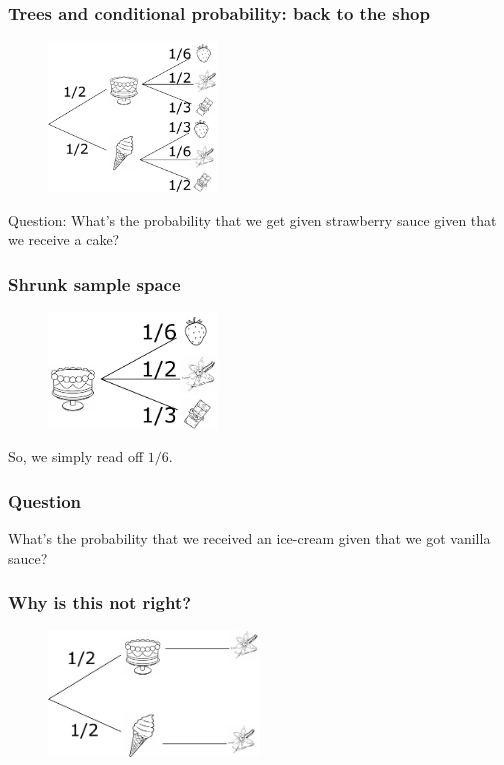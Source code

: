 \documentclass{beamer}
\begin{document}
	\begin{frame}
		\frametitle{Trees and conditional probability: back to the shop}
		
		\begin{figure}[ht]
			\centerline{\includegraphics[width=0.4\textwidth]{./figures/tree-prob-1.pdf}}
		\end{figure}
	
	Question: What's the probability that we get given strawberry sauce given that we receive a cake?
		
	\end{frame}

	\begin{frame}
		\frametitle{Shrunk sample space}
		
		\begin{figure}[ht]
			\centerline{\includegraphics[width=0.4\textwidth]{./figures/tree-prob-1-shrunk.pdf}}
		\end{figure}
	
	So, we simply read off $1/6$.
		
	\end{frame}

	\begin{frame}
		\frametitle{Question}
		
		What's the probability that we received an ice-cream given that we got vanilla sauce?
		
		
	\end{frame}

	\begin{frame}
		\frametitle{Why is this not right?}

		\begin{figure}[ht]
			\centerline{\includegraphics[width=0.5\textwidth]{./figures/tree-prob-2.pdf}}
		\end{figure}
	
	\end{frame}
	
\end{document}
